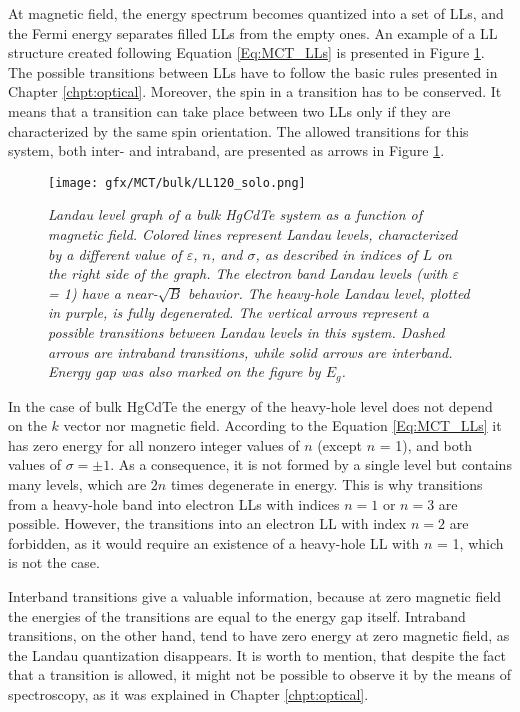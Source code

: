 \documentclass[titlepage,a4paper]{book}
\begin{document}
At magnetic field, the energy spectrum becomes quantized into a set of LLs, and the Fermi energy separates filled LLs from the empty ones. An example of a LL structure created following Equation \ref{Eq:MCT_LLs} is presented in Figure \ref{fig:MCT_LL120_solo}. The possible transitions between LLs have to follow the basic rules presented in Chapter \ref{chpt:optical}. Moreover, the spin in a transition has to be conserved. It means that a transition can take place between two LLs only if they are characterized by the same spin orientation. The allowed transitions for this system, both inter- and intraband, are presented as arrows in Figure \ref{fig:MCT_LL120_solo}. 
\begin{figure}[ht]
	\centering
	\texttt{[image: gfx/MCT/bulk/LL120\_solo.png]}
	\vspace{-10pt}
	\caption{\textit{Landau level graph of a bulk HgCdTe system as a function of magnetic field. Colored lines represent Landau levels, characterized by a different value of $\varepsilon$, $n$, and $\sigma$, as described in indices of $L$ on the right side of the graph. The electron band Landau levels (with $\varepsilon$ = 1) have a near-$\sqrt{B}$ behavior. The heavy-hole Landau level, plotted in purple, is fully degenerated. The vertical arrows represent a possible transitions between Landau levels in this system. Dashed arrows are intraband transitions, while solid arrows are interband. Energy gap was also marked on the figure by $E_g$.}}
	\label{fig:MCT_LL120_solo}
\end{figure}

In the case of bulk HgCdTe the energy of the heavy-hole level does not depend on the $k$ vector nor magnetic field. According to the Equation \ref{Eq:MCT_LLs} it has zero energy for all nonzero integer values of $n$ (except $n$ = 1), and both values of $\sigma = \pm 1$. As a consequence, it is not formed by a single level but contains many levels, which are $2n$ times degenerate in energy. This is why transitions from a heavy-hole band into electron LLs with indices $n = 1$ or $n = 3$  are possible. However, the transitions into an electron LL with index $n = 2$ are forbidden, as it would require an existence of a heavy-hole LL with $n$ = 1, which is not the case. 

Interband transitions give a valuable information, because at zero magnetic field the energies of the transitions are equal to the energy gap itself. Intraband transitions, on the other hand, tend to have zero energy at zero magnetic field, as the Landau quantization disappears. It is worth to mention, that despite the fact that a transition is allowed, it might not be possible to observe it by the means of spectroscopy, as it was explained in Chapter \ref{chpt:optical}.
\end{document}
